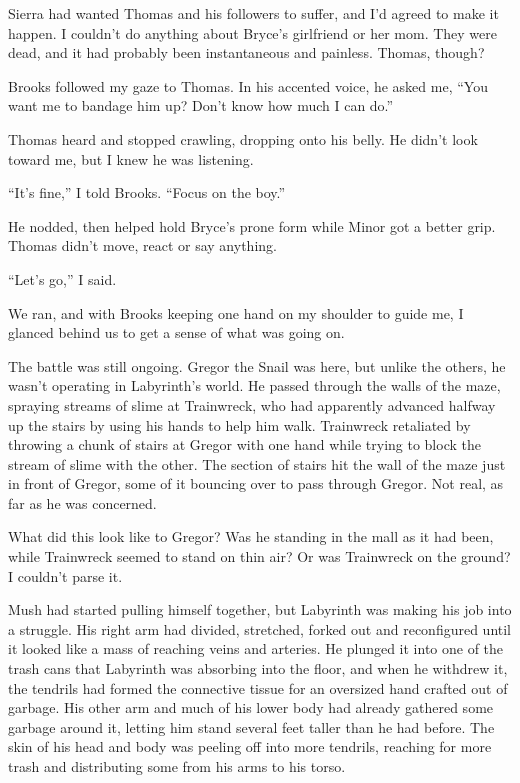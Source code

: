 Sierra had wanted Thomas and his followers to suffer, and I'd agreed to make it happen.  I couldn't do anything about Bryce's girlfriend or her mom.  They were dead, and it had probably been instantaneous and painless.  Thomas, though?



Brooks followed my gaze to Thomas.  In his accented voice, he asked me, ``You want me to bandage him up?  Don't know how much I can do.''



Thomas heard and stopped crawling, dropping onto his belly.  He didn't look toward me, but I knew he was listening.



``It's fine,'' I told Brooks.  ``Focus on the boy.''



He nodded, then helped hold Bryce's prone form while Minor got a better grip.  Thomas didn't move, react or say anything.



``Let's go,'' I said.



We ran, and with Brooks keeping one hand on my shoulder to guide me, I glanced behind us to get a sense of what was going on.



The battle was still ongoing.  Gregor the Snail was here, but unlike the others, he wasn't operating in Labyrinth's world.  He passed through the walls of the maze, spraying streams of slime at Trainwreck, who had apparently advanced halfway up the stairs by using his hands to help him walk.  Trainwreck retaliated by throwing a chunk of stairs at Gregor with one hand while trying to block the stream of slime with the other.  The section of stairs hit the wall of the maze just in front of Gregor, some of it bouncing over to pass through Gregor.  Not real, as far as he was concerned.



What did this look like to Gregor?  Was he standing in the mall as it had been, while Trainwreck seemed to stand on thin air?  Or was Trainwreck on the ground?  I couldn't parse it.



Mush had started pulling himself together, but Labyrinth was making his job into a struggle.  His right arm had divided, stretched, forked out and reconfigured until it looked like a mass of reaching veins and arteries.  He plunged it into one of the trash cans that Labyrinth was absorbing into the floor, and when he withdrew it, the tendrils had formed the connective tissue for an oversized hand crafted out of garbage.  His other arm and much of his lower body had already gathered some garbage around it, letting him stand several feet taller than he had before.  The skin of his head and body was peeling off into more tendrils, reaching for more trash and distributing some from his arms to his torso.



